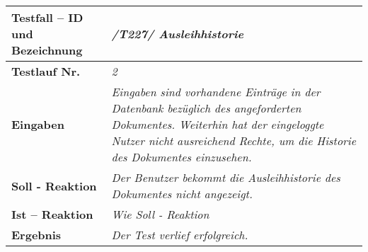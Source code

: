 \begin{longtable}{|p{5cm}|p{10cm}|}
\hline
\textbf{Testfall -- ID und Bezeichnung} & \textit{/T227/ Ausleihhistorie} \\
\hline
\textbf{Testlauf Nr.} & \textit{2} \\
\hline
\textbf{Eingaben} & \textit{Eingaben sind vorhandene Einträge in der Datenbank
bezüglich des angeforderten Dokumentes. Weiterhin hat der eingeloggte Nutzer
nicht ausreichend Rechte, um die Historie des Dokumentes einzusehen. } \\
\hline
\textbf{Soll - Reaktion} & \textit{Der Benutzer bekommt die Ausleihhistorie des
Dokumentes nicht angezeigt. } \\
\hline
\textbf{Ist -- Reaktion} & \textit{Wie Soll - Reaktion} \\
\hline
\textbf{Ergebnis} & \textit{Der Test verlief erfolgreich. } \\
\hline
 \end{longtable}
